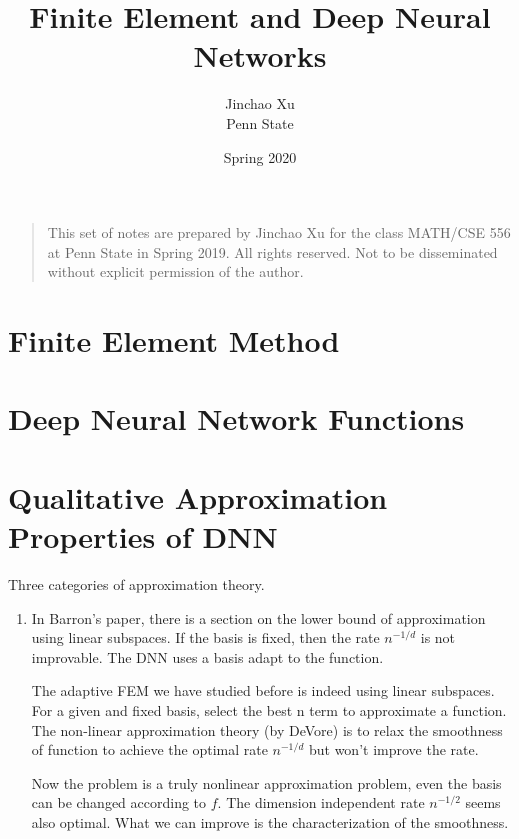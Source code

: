 \documentclass[leqno,labelfig,psfigt]{svmono}
\begin{document}
\title{Finite Element and Deep Neural Networks}
\author{Jinchao Xu\\Penn State}
\date{Spring 2020}
\maketitle

\begin{quote} 
This set of notes are prepared by Jinchao Xu for the class MATH/CSE
556 at Penn State in Spring 2019. All rights reserved.  Not to be
disseminated without explicit permission of the author.
\end{quote}
\tableofcontents

\chapter{Finite Element Method}



\chapter{Deep Neural Network Functions}



%
%
%
\chapter{Qualitative Approximation Properties of DNN
}\label{ch:approx}

Three categories of approximation theory.
\begin{enumerate}
	\item 
	In Barron's paper, there is a section on the lower bound of
	approximation using linear subspaces. If the basis is fixed, then the
	rate $n^{-1/d}$ is not improvable. The DNN uses a basis adapt to the
	function.
	
	The adaptive FEM we have studied before is indeed using linear
	subspaces. For a given and fixed basis, select the best n term to
	approximate a function. The non-linear approximation theory (by
	DeVore) is to relax the smoothness of function to achieve the optimal
	rate $n^{-1/d}$ but won't improve the rate.
	
	Now the problem is a truly nonlinear approximation problem, even the
	basis can be changed according to $f$. The dimension independent rate
	$n^{-1/2}$ seems also optimal. What we can improve is the
	characterization of the smoothness.
\end{enumerate}


\end{document}
